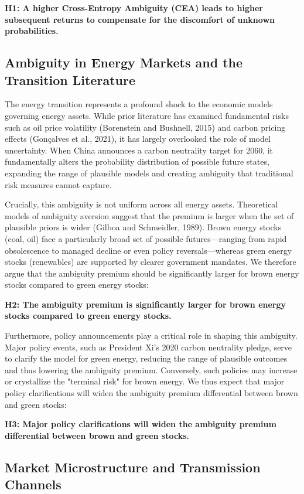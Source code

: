 \documentclass[preprint,12pt,authoryear]{elsarticle}
\begin{document}
\noindent
\textbf{H1: A higher Cross-Entropy Ambiguity (CEA) leads to higher subsequent returns to compensate for the discomfort of unknown probabilities.}

\subsection{Ambiguity in Energy Markets and the Transition Literature}

The energy transition represents a profound shock to the economic models governing energy assets. While prior literature has examined fundamental risks such as oil price volatility (Borenstein and Bushnell, 2015) and carbon pricing effects (Gonçalves et al., 2021), it has largely overlooked the role of model uncertainty. When China announces a carbon neutrality target for 2060, it fundamentally alters the probability distribution of possible future states, expanding the range of plausible models and creating ambiguity that traditional risk measures cannot capture.

Crucially, this ambiguity is not uniform across all energy assets. Theoretical models of ambiguity aversion suggest that the premium is larger when the set of plausible priors is wider (Gilboa and Schmeidler, 1989). Brown energy stocks (coal, oil) face a particularly broad set of possible futures—ranging from rapid obsolescence to managed decline or even policy reversals—whereas green energy stocks (renewables) are supported by clearer government mandates. We therefore argue that the ambiguity premium should be significantly larger for brown energy stocks compared to green energy stocks:

\noindent
\textbf{H2: The ambiguity premium is significantly larger for brown energy stocks compared to green energy stocks.}

Furthermore, policy announcements play a critical role in shaping this ambiguity. Major policy events, such as President Xi's 2020 carbon neutrality pledge, serve to clarify the model for green energy, reducing the range of plausible outcomes and thus lowering the ambiguity premium. Conversely, such policies may increase or crystallize the "terminal risk" for brown energy. We thus expect that major policy clarifications will widen the ambiguity premium differential between brown and green stocks:

\noindent
\textbf{H3: Major policy clarifications will widen the ambiguity premium differential between brown and green stocks.}

\subsection{Market Microstructure and Transmission Channels}
\end{document}
